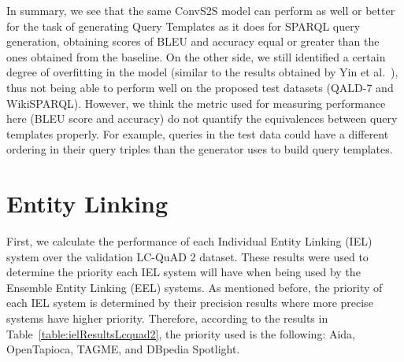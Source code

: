 In summary, we see that the same ConvS2S model can perform as well or better for the task of 
generating Query Templates as it does for SPARQL query generation, obtaining scores of BLEU and 
accuracy equal or greater than the ones obtained from the baseline. On the other side, we still 
identified a certain degree of overfitting in the model (similar to the results obtained by 
Yin et al.~\cite{nmt:nl-to-sparql-Yin19}), thus not being able to perform well on the proposed 
test datasets (QALD-7 and WikiSPARQL). However, we think the metric used for measuring 
performance here (BLEU score and accuracy) do not quantify the equivalences between query 
templates properly. For example, queries in the test data could have a different ordering in 
their query triples than the generator uses to build query templates.

\section{Entity Linking}
\label{cap5:results/entityLinking}
First, we calculate the performance of each Individual Entity Linking (IEL) system over the 
validation LC-QuAD 2 dataset. These results were used to determine the priority each IEL system 
will have when being used by the Ensemble Entity Linking (EEL) systems. As mentioned before, the 
priority of each IEL system is determined by their precision results where more precise systems 
have higher priority. Therefore, according to the results in Table~\ref{table:ielResultsLcquad2}, 
the priority used is the following: Aida, OpenTapioca, TAGME, and DBpedia Spotlight.

